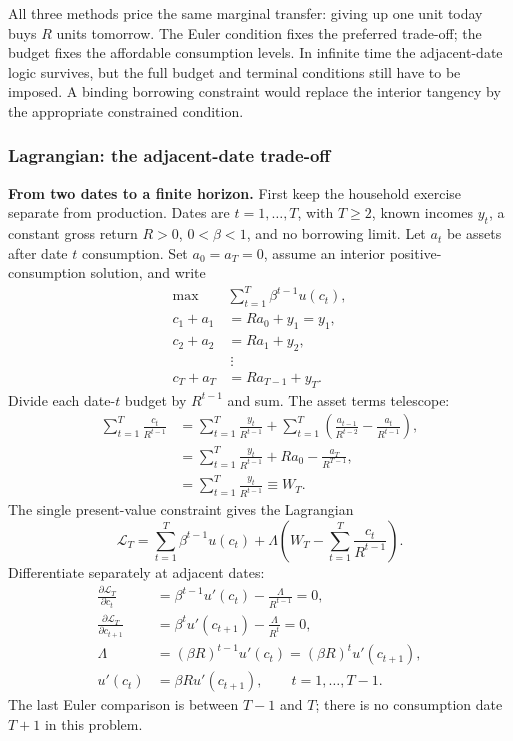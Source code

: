 All three methods price the same marginal transfer: giving up one unit today
buys $R$ units tomorrow. The Euler condition fixes the preferred trade-off;
the budget fixes the affordable consumption levels. In infinite time the
adjacent-date logic survives, but the full budget and terminal conditions
still have to be imposed. A binding borrowing constraint would replace the
interior tangency by the appropriate constrained condition.


\subsubsection{Lagrangian: the adjacent-date trade-off}\label{method-of-lagrangian}

\textbf{From two dates to a finite horizon.}
First keep the household exercise separate from production. Dates are
$t=1,\ldots,T$, with $T\geq2$, known incomes $y_t$, a constant gross return
$R>0$, $0<\beta<1$, and no borrowing limit. Let $a_t$ be assets after date
$t$ consumption. Set $a_0=a_T=0$, assume an interior positive-consumption
solution, and write
\begin{align}
\max\;&\sum_{t=1}^T\beta^{t-1}u(c_t),\\
c_1+a_1&=Ra_0+y_1=y_1,\\
c_2+a_2&=Ra_1+y_2,\\
&\ \vdots\nonumber\\
c_T+a_T&=Ra_{T-1}+y_T.
\end{align}
Divide each date-$t$ budget by $R^{t-1}$ and sum. The asset terms telescope:
\begin{align}
\sum_{t=1}^T\frac{c_t}{R^{t-1}}
&=\sum_{t=1}^T\frac{y_t}{R^{t-1}}
 +\sum_{t=1}^T\left(\frac{a_{t-1}}{R^{t-2}}
                         -\frac{a_t}{R^{t-1}}\right),\\
&=\sum_{t=1}^T\frac{y_t}{R^{t-1}}+Ra_0-\frac{a_T}{R^{T-1}},\\
&=\sum_{t=1}^T\frac{y_t}{R^{t-1}}\equiv W_T.
\end{align}
The single present-value constraint gives the Lagrangian
\[
\mathscr L_T=\sum_{t=1}^T\beta^{t-1}u(c_t)
 +\Lambda\left(W_T-\sum_{t=1}^T\frac{c_t}{R^{t-1}}\right).
\]
Differentiate separately at adjacent dates:
\begin{align}
\frac{\partial\mathscr L_T}{\partial c_t}
 &=\beta^{t-1}u'(c_t)-\frac{\Lambda}{R^{t-1}}=0,\\
\frac{\partial\mathscr L_T}{\partial c_{t+1}}
 &=\beta^tu'(c_{t+1})-\frac{\Lambda}{R^t}=0,\\
\Lambda&=(\beta R)^{t-1}u'(c_t)
       =(\beta R)^tu'(c_{t+1}),\\
u'(c_t)&=\beta R u'(c_{t+1}),\qquad t=1,\ldots,T-1.
\end{align}
The last Euler comparison is between $T-1$ and $T$; there is no consumption
date $T+1$ in this problem.

